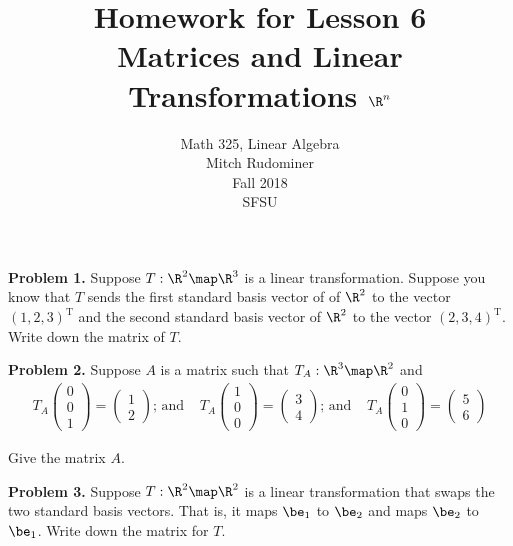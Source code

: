\documentclass[oneside,12pt]{amsart}
\begin{document}
\title{Homework for Lesson 6 \\ Matrices and Linear Transformations $\R^n$}
\author{Math 325, Linear Algebra \\ Mitch Rudominer \\ Fall 2018 \\ SFSU }
\date{}

\maketitle

\textbf{Problem 1.} Suppose $T:\R^2\map\R^3$ is a linear transformation.
Suppose you know that $T$ sends the first standard basis vector of of $\R^2$
to the vector $(1, 2, 3)^{\text{T}}$ and the second standard basis vector
of $\R^2$ to the vector $(2,3,4)^{\text{T}}$. Write down the matrix of $T$.

\bigskip
\bigskip
\bigskip
\bigskip
\bigskip
\bigskip

\textbf{Problem 2.}  Suppose $A$ is a matrix such that $T_A:\R^3\map\R^2$ and
$$
\begin{matrix}
T_A \begin{pmatrix} 0 \\ 0 \\ 1 \end{pmatrix} = \begin{pmatrix} 1 \\ 2 \end{pmatrix}\text{; and }
&
T_A \begin{pmatrix} 1 \\ 0 \\ 0 \end{pmatrix} = \begin{pmatrix} 3 \\ 4 \end{pmatrix}\text{; and }
&
T_A \begin{pmatrix} 0 \\ 1 \\ 0 \end{pmatrix} = \begin{pmatrix} 5 \\ 6 \end{pmatrix}
\end{matrix}
$$

Give the matrix $A$.

\bigskip
\bigskip
\bigskip
\bigskip
\bigskip
\bigskip

\textbf{Problem 3.}  Suppose $T:\R^2\map\R^2$ is a linear transformation
that swaps the two standard basis vectors. That is, it
maps $\be_1$ to $\be_2$ and maps $\be_2$ to $\be_1$. Write down the matrix
for $T$.
\end{document}
